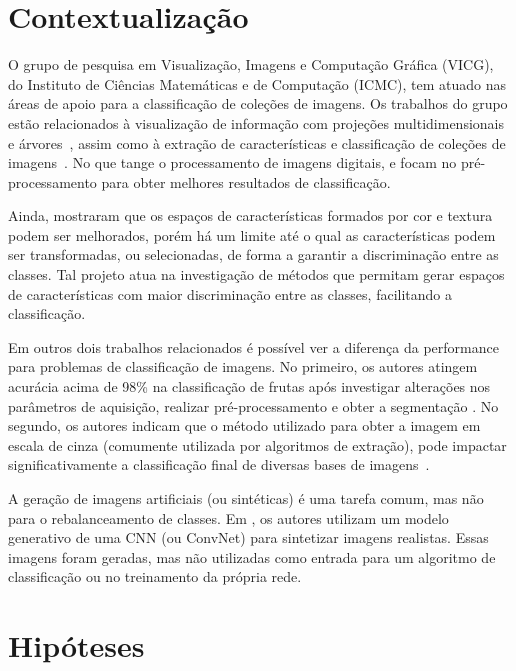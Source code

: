 \section{Contextualização}

O grupo de pesquisa em Visualização, Imagens e Computação Gráfica (VICG), do Instituto de Ciências Matemáticas e de Computação (ICMC), tem atuado nas áreas de apoio para a classificação de coleções de imagens. Os trabalhos do grupo estão relacionados à visualização de informação com projeções multidimensionais e árvores~\cite{Joia2011}, assim como à extração de características e classificação de coleções de imagens~\cite{Paiva2011}. No que tange o processamento de imagens digitais,  e  focam no pré-processamento para obter melhores resultados de classificação.

Ainda,  mostraram que os espaços de características formados por cor e textura podem ser melhorados, porém há um limite até o qual as características podem ser transformadas, ou selecionadas, de forma a garantir a discriminação entre as classes. Tal projeto atua na investigação de métodos que permitam gerar espaços de características com maior discriminação entre as classes, facilitando a classificação.

Em outros dois trabalhos relacionados é possível ver a diferença da performance para problemas de classificação de imagens. No primeiro, os autores atingem acurácia acima de 98\% na classificação de frutas após investigar alterações nos parâmetros de aquisição, realizar pré-processamento e obter a segmentação \cite{Rocha2010}. No segundo, os autores indicam que o método utilizado para obter a imagem em escala de cinza (comumente utilizada por algoritmos de extração), pode impactar significativamente a classificação final de diversas bases de imagens~\cite{Kanan2012}.

A geração de imagens artificiais (ou sintéticas) é uma tarefa comum, mas não para o rebalanceamento de classes. Em \cite{Xie2016}, os autores utilizam um modelo generativo de uma CNN (ou ConvNet) para sintetizar imagens realistas. Essas imagens foram geradas, mas não utilizadas como entrada para um algoritmo de classificação ou no treinamento da própria rede.

\section{Hipóteses}

